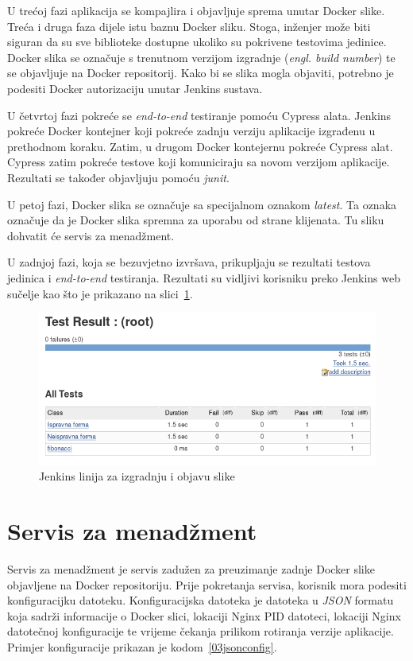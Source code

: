 U trećoj fazi aplikacija se kompajlira i objavljuje sprema unutar Docker slike. Treća i druga faza
dijele istu baznu Docker sliku. Stoga, inženjer može biti siguran da su sve biblioteke dostupne
ukoliko su pokrivene testovima jedinice. Docker slika se označuje s trenutnom verzijom izgradnje
(\textit{engl. build number}) te se objavljuje na Docker repositorij. Kako bi se slika mogla
objaviti, potrebno je podesiti Docker autorizaciju unutar Jenkins sustava.

U četvrtoj fazi pokreće se \textit{end-to-end} testiranje pomoću Cypress alata. Jenkins pokreće
Docker kontejner koji pokreće zadnju verziju aplikacije izgrađenu u prethodnom koraku. Zatim, u
drugom Docker kontejernu pokreće Cypress alat. Cypress zatim pokreće testove koji komuniciraju sa
novom verzijom aplikacije. Rezultati se također objavljuju pomoću \textit{junit}.

U petoj fazi, Docker slika se označuje sa specijalnom oznakom \textit{latest}. Ta oznaka označuje
da je Docker slika spremna za uporabu od strane klijenata. Tu sliku dohvatit će servis za
menadžment.

U zadnjoj fazi, koja se bezuvjetno izvršava, prikupljaju se rezultati testova jedinica i
\textit{end-to-end} testiranja. Rezultati su vidljivi korisniku preko Jenkins web sučelje kao što je
prikazano na slici~\ref{fig:03jenkins_result}.

\begin{figure}[h]
    \centering
    \includegraphics[width=\textwidth]{img/03/jenkins_result.png}
    \caption{Jenkins linija za izgradnju i objavu slike}%
    \label{fig:03jenkins_result}
\end{figure}

\section{Servis za menadžment}
Servis za menadžment je servis zadužen za preuzimanje zadnje Docker slike objavljene na Docker
repositoriju. Prije pokretanja servisa, korisnik mora podesiti konfiguracijku datoteku.
Konfiguracijska datoteka je datoteka u \textit{JSON} formatu koja sadrži informacije o Docker slici,
lokaciji Nginx PID datoteci, lokaciji Nginx datotečnoj konfiguracije te vrijeme čekanja prilikom
rotiranja verzije aplikacije. Primjer konfiguracije prikazan je kodom~\ref{03jsonconfig}.

